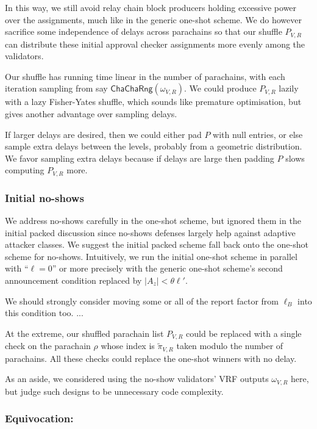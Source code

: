 \begin{enumerate}
\begin{enumerate}

In this way, we still avoid relay chain block producers holding excessive power over the assignments, much like in the generic one-shot scheme.  We do however sacrifice some independence of delays across parachains so that our shuffle $P_{V,R}$ can distribute these initial approval checker assignments more evenly among the validators.  

Our shuffle has running time linear in the number of parachains, with each iteration sampling from say $\mathsf{ChaChaRng}(\omega_{V,R})$.  We could produce $P_{V,R}$ lazily with a lazy Fisher-Yates shuffle, which sounds like premature optimisation, but gives another advantage over sampling delays.

If larger delays are desired, then we could either pad $P$ with null entries, or else sample extra delays between the levels, probably from a geometric distribution.  We favor sampling extra delays because if delays are large then padding $P$ slows computing $P_{V,R}$ more.

\subsubsection{Initial no-shows}

We address no-shows carefully in the one-shot scheme, but ignored them in the initial packed discussion since no-shows defenses largely help against adaptive attacker classes.  We suggest the initial packed scheme fall back onto the one-shot scheme for no-shows.  Intuitively, we run the initial one-shot scheme in parallel with ``$\ell = 0$'' or more precisely with the generic one-shot scheme's second announcement condition replaced by $|A_z| < \theta \ell'$. 

We should strongly consider moving some or all of the report factor from $\ell_B$ into this condition too.  ...

At the extreme, our shuffled parachain list $P_{V,R}$ could be replaced with a single check on the parachain $\rho$ whose index is $\tilde{\pi}_{V,R}$ taken modulo the number of parachains.  All these checks could replace the one-shot winners with no delay. 

As an aside, we considered using the no-show validators' VRF outputs $\omega_{V,R}$ here, but judge such designs to be unnecessary code complexity. 

\subsubsection{Equivocation:}


\end{enumerate}
\end{enumerate}
